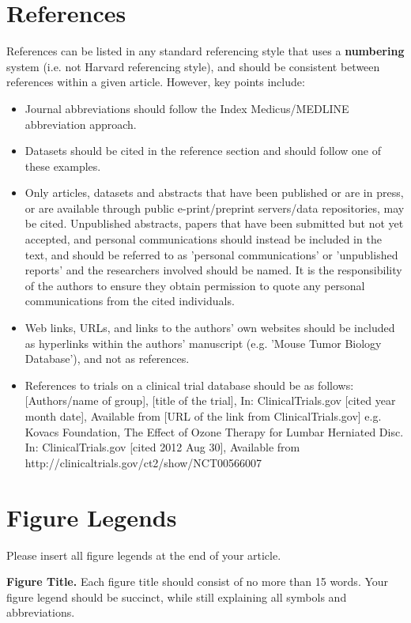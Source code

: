 \documentclass[10pt]{article}
\begin{document}
\section{References}
References can be listed in any standard referencing style that uses a {\bf numbering} system (i.e. not Harvard referencing style), and should be consistent between references within a given article. However, key points include:
\begin{itemize}
\item Journal abbreviations should follow the Index Medicus/MEDLINE abbreviation approach.
\end{itemize}
\begin{itemize}
\item Datasets should be cited in the reference section and should follow one of these examples.
\end{itemize}
\begin{itemize}
\item Only articles, datasets and abstracts that have been published or are in press, or are available through public e-print/preprint servers/data repositories, may be cited. Unpublished abstracts, papers that have been submitted but not yet accepted, and personal communications should instead be included in the text, and should be referred to as {'}personal communications{'} or {'}unpublished reports{'} and the researchers involved should be named. It is the responsibility of the authors to ensure they obtain permission to quote any personal communications from the cited individuals.
\end{itemize}
\begin{itemize}
\item Web links, URLs, and links to the authors{'} own websites should be included as hyperlinks within the authors' manuscript (e.g. 'Mouse Tumor Biology Database'), and not as references.
\end{itemize}
\begin{itemize}
\item References to trials on a clinical trial database should be as follows:
[Authors/name of group], [title of the trial], In: ClinicalTrials.gov [cited year month date], Available from [URL of the link from ClinicalTrials.gov] e.g. Kovacs Foundation, The Effect of Ozone Therapy for Lumbar Herniated Disc. In: ClinicalTrials.gov [cited 2012 Aug 30], Available from http://clinicaltrials.gov/ct2/show/NCT00566007
\end{itemize}


\section*{Figure Legends}
Please insert all figure legends at the end of your article. 

\textbf{\label{fig:fig1} Figure Title.} Each figure title should consist of no more than 15 words. Your figure legend should be succinct, while still explaining all symbols and abbreviations. 



\end{document}
